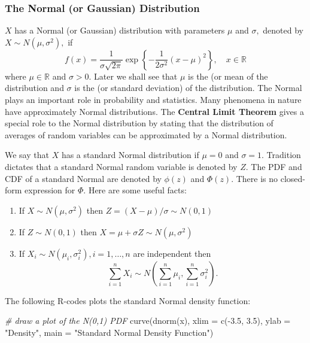 \documentclass[
  14pt,
]{memoir}
\newenvironment{Shaded}{\begin{snugshade}}{\end{snugshade}}
\newcommand{\AttributeTok}[1]{\textcolor[rgb]{0.77,0.63,0.00}{#1}}
\newcommand{\CommentTok}[1]{\textcolor[rgb]{0.56,0.35,0.01}{\textit{#1}}}
\newcommand{\FloatTok}[1]{\textcolor[rgb]{0.00,0.00,0.81}{#1}}
\newcommand{\FunctionTok}[1]{\textcolor[rgb]{0.00,0.00,0.00}{#1}}
\newcommand{\NormalTok}[1]{#1}
\newcommand{\SpecialCharTok}[1]{\textcolor[rgb]{0.00,0.00,0.00}{#1}}
\newcommand{\StringTok}[1]{\textcolor[rgb]{0.31,0.60,0.02}{#1}}
\begin{document}
\hypertarget{the-normal-or-gaussian-distribution}{%
\subsubsection{The Normal (or Gaussian) Distribution}\label{the-normal-or-gaussian-distribution}}

\(X\) has a Normal (or Gaussian) distribution with parameters \(\mu\) and \(\sigma,\) denoted by \(X \sim N\left(\mu, \sigma^{2}\right),\) if
\[
f(x)=\frac{1}{\sigma \sqrt{2 \pi}} \exp \left\{-\frac{1}{2 \sigma^{2}}(x-\mu)^{2}\right\}, \quad x \in \mathbb{R}
\]
where \(\mu \in \mathbb{R}\) and \(\sigma>0.\) Later we shall see that \(\mu\) is the  (or mean of the distribution and \(\sigma\) is the  (or standard deviation) of the distribution. The Normal plays an important role in probability and statistics. Many phenomena in nature have approximately Normal distributions. The \textbf{Central Limit Theorem} gives a special role to the Normal distribution by stating that the distribution of averages of random variables can be approximated by a Normal distribution.

We say that \(X\) has a standard Normal distribution if \(\mu=0\) and \(\sigma=1\). Tradition dictates that a standard Normal random variable is denoted by \(Z\). The PDF and CDF of a standard Normal are denoted by \(\phi(z)\) and \(\Phi(z)\). There is no closed-form expression for \(\Phi\). Here are some useful facts:

\begin{enumerate}
\def\labelenumi{(\roman{enumi})}
\item
  If \(X \sim N\left(\mu, \sigma^{2}\right)\) then \(Z=(X-\mu) / \sigma \sim N(0,1)\)
\item
  If \(Z \sim N(0,1)\) then \(X=\mu+\sigma Z \sim N\left(\mu, \sigma^{2}\right)\)
\item
  If \(X_{i} \sim N\left(\mu_{i}, \sigma_{i}^{2}\right), i=1, \ldots, n\) are independent then
  \[
  \sum_{i=1}^{n} X_{i} \sim N\left(\sum_{i=1}^{n} \mu_{i}, \sum_{i=1}^{n} \sigma_{i}^{2}\right).
  \]
\end{enumerate}

The following \textsf{R}-codes plots the standard Normal density function:

\begin{Shaded}
\begin{Highlighting}[]
\CommentTok{\# draw a plot of the N(0,1) PDF}
\FunctionTok{curve}\NormalTok{(}\FunctionTok{dnorm}\NormalTok{(x),}
      \AttributeTok{xlim =} \FunctionTok{c}\NormalTok{(}\SpecialCharTok{{-}}\FloatTok{3.5}\NormalTok{, }\FloatTok{3.5}\NormalTok{),}
      \AttributeTok{ylab =} \StringTok{"Density"}\NormalTok{, }
      \AttributeTok{main =} \StringTok{"Standard Normal Density Function"}\NormalTok{) }
\end{Highlighting}
\end{Shaded}
\end{document}
